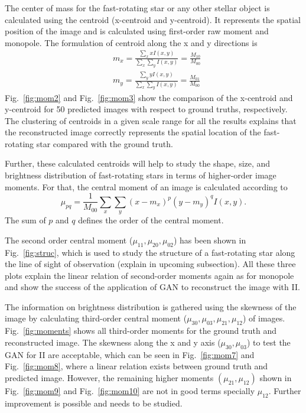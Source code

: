 The center of mass for the fast-rotating star or any other stellar object is calculated using the centroid (x-centroid and y-centroid). It represents the spatial position of the image and is calculated using first-order raw moment and monopole. The formulation of centroid along the x and y directions is
\begin{equation}
	\begin{aligned}
		&m_x = \frac{\sum_{x} x I(x,y)}{\sum_{x} \sum_{y} I(x, y)} = \frac{M_{10}}{M_{00}} \\
		&m_y = \frac{\sum_{y} y I(x,y)}{\sum_{x} \sum_{y} I(x, y)} = \frac{M_{01}}{M_{00}}
	\end{aligned}  
\end{equation}
Fig.~\ref{fig:mom2} and Fig.~\ref{fig:mom3} show the comparison of the x-centroid and y-centroid for 50 predicted images with respect to ground truths, respectively. The clustering of centroids in a given scale range for all the results explains that the reconstructed image correctly represents the spatial location of the fast-rotating star compared with the ground truth.

Further, these calculated centroids will help to study the shape, size, and brightness distribution of fast-rotating stars in terms of higher-order image moments. For that, the central moment of an image is calculated according to
\begin{equation}
	\mu_{pq} = \frac{1}{M_{00}}\sum_{x} \sum_{y} (x - m_x)^p (y - m_y)^q I(x, y).
\end{equation}
The sum of $p$ and $q$ defines the order of the central moment.

The second order central moment ($\mu_{11}, \mu_{20}, \mu_{02}$) has been shown in Fig.~\ref{fig:struc}, which is used to study the structure of a fast-rotating star along the line of sight of observation (explain in upcoming subsection). All these three plots explain the linear relation of second-order moments again as for monopole and show the success of the application of GAN to reconstruct the image with II.

The information on brightness distribution is gathered using the skewness of the image by calculating third-order central moment ($\mu_{30}, \mu_{03}, \mu_{21}, \mu_{12}$) of images. Fig.~\ref{fig:moments} shows all third-order moments for the ground truth and reconstructed image. The skewness along the x and y axis ($\mu_{30}, \mu_{03}$) to test the GAN for II are acceptable, which can be seen in Fig.~\ref{fig:mom7} and Fig.~\ref{fig:mom8}, where a linear relation exists between ground truth and predicted image. However, the remaining higher moments $(\mu_{21}, \mu_{12})$ shown in Fig.~\ref{fig:mom9} and Fig.~\ref{fig:mom10} are not in good terms specially $\mu_{12}$. Further improvement is possible and needs to be studied.

